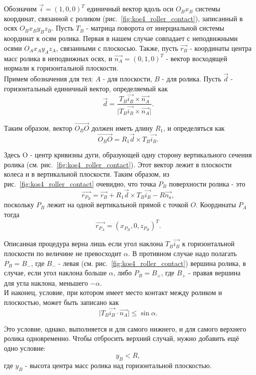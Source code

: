\documentclass[12pt]{article}
\begin{document}
Обозначим $\vec{i} = (1,0,0)^T$ единичный вектор вдоль оси $O_Bx_B$ системы координат, связанной с роликом (рис.~\ref{fig:kos4_roller_contact}), записанный в осях $O_Bx_By_Bz_B$. Пусть $T_B$ - матрица поворота от инерциальной системы координат к осям ролика. Первая в нашем случае совпадает с неподвижными осями $O_Ax_Ay_Az_A$, связанными с плоскосью. Также, пусть $\vec{r_B}$ - координаты центра масс ролика в неподвижных осях, и $\vec{n_A} = (0,1,0)^T$ - вектор восходящей нормали к горизонтальной плоскости.\\

Примем обозначения для тел: $A$ - для плоскости, $B$ - для ролика. Пусть $\vec{d}$ - горизонтальный единичный вектор, определяемый как
$$\vec{d} = \frac{T_B\vec{i_B}\times\vec{n_A}}{\vert T_B\vec{i_B}\times\vec{n_A}\vert}.$$

Таким образом, вектор $\vec{O_BO}$ должен иметь длину $R_1$, и определяться как
$$\vec{O_BO} = R_1\vec{d}\times T_B\vec{i_B}.$$

Здесь O - центр кривизны дуги, образующей одну сторону вертикального сечения ролика (см. рис.~\ref{fig:kos4_roller_contact}). Этот вектор лежит в плоскости колеса и в вертикальной плоскости. Таким образом, из рис.~\ref{fig:kos4_roller_contact} очевидно, что точка $P_B$ поверхности ролика - это
\begin{equation}
\label{rPB}
\vec{r_{P_B}} = \vec{r_B} + R_1\vec{d}\times T_B\vec{i_B}-R\vec{n_a},
\end{equation}
поскольку $P_B$ лежит на одной вертикальной прямой с точкой $O$. Координаты $P_A$ тогда
\begin{equation}
\vec{r_{P_A}} = (x_{P_B},0,z_{P_B})^T.
\end{equation}

Описанная процедура верна лишь если угол наклона $T_B\vec{i_B}$ к горизонтальной плоскости по величине не превосходит $\alpha$. В противном случае надо полагать $P_B = B_-$, где $B_-$ - левая (см. рис.~\ref{fig:kos4_roller_contact}) вершина ролика, в случае, если угол наклона больше $\alpha$, либо $P_B = B_+$, где $B_+$ - правая вершина для угла наклона, меньшего $-\alpha$.\\

И наконец, условие, при котором имеет место контакт между роликом и плоскостью, может быть записано как
\begin{equation}\label{contact_1}
\vert T_B\vec{i_B}\cdot\vec{n_A}\vert\leq\sin\alpha.
\end{equation}

Это условие, однако, выполняется и для самого нижнего, и для самого верхнего ролика одновременно. Чтобы отбросить верхний случай, нужно добавить ещё одно условие:
\begin{equation}\label{contact_2}
y_B<R,
\end{equation}
где $y_B$ - высота центра масс ролика над горизонтальной плоскостью.\\
\end{document}
